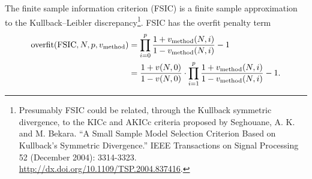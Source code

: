 \documentclass[12pt,letterpaper]{article}
\begin{document}
The finite sample information criterion (FSIC) is a finite sample approximation
to the Kullback--Leibler discrepancy\footnote{Presumably FSIC could be related,
through the Kullback symmetric divergence, to the KICc and AKICc criteria
proposed by Seghouane, A. K. and M. Bekara.  ``A Small Sample Model Selection
Criterion Based on Kullback's Symmetric Divergence.'' IEEE Transactions on
Signal Processing 52 (December 2004): 3314-3323.
\url{http://dx.doi.org/10.1109/TSP.2004.837416}.}. FSIC has the overfit penalty
term
\begin{align}
    \text{overfit}\!\left(\text{FSIC},N,p,v_\text{method}\right)
    &=
    \prod_{i=0}^{p}
    \frac{
        1 + v_\text{method}\!\left(N,i\right)
    }{
        1 - v_\text{method}\!\left(N,i\right)
    }
    - 1
    \notag
    \\
    &=
    \frac{
        1 + v\!\left(N,0\right)
    }{
        1 - v\!\left(N,0\right)
    }
    \cdot
    \prod_{i=1}^{p}
    \frac{
        1 + v_\text{method}\!\left(N,i\right)
    }{
        1 - v_\text{method}\!\left(N,i\right)
    }
    - 1
    .
    \label{eq:fsicGeneral}
\end{align}
\end{document}
